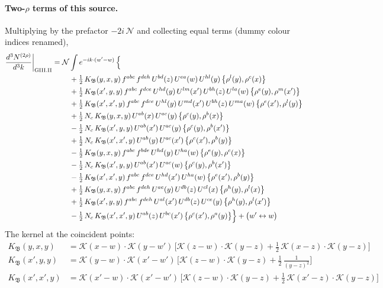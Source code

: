 \documentclass[10pt]{article}
\numberwithin{equation}{section}
\newcommand{\KK}{\mathcal K}
\newcommand{\NN}{\mathcal N}
\begin{document}
\paragraph{Two-$\rho$ terms of this source.} Multiplying by the prefactor $-2i\,\NN$ and collecting equal terms (dummy colour indices renamed),
\begin{align}
\frac{d^3N^{(2\rho)}}{d^3k}\bigg|_{\rm GIII.II}={}&\NN\int e^{-ik\cdot(w'-w)}\,\Big\{\notag\\
&\quad +\tfrac12\,K_{\mathfrak B}(y,x,y)\,f^{abc}\,f^{deh}\,U^{bd}(z)\,U^{ea}(w)\,U^{hl}(y)\,\big\{\rho^{l}(y),\rho^{c}(x)\big\}\notag\\
&\quad +\tfrac12\,K_{\mathfrak B}(x',y,y)\,f^{abc}\,f^{dce}\,U^{hd}(y)\,U^{lm}(x')\,U^{bh}(z)\,U^{la}(w)\,\big\{\rho^{e}(y),\rho^{m}(x')\big\}\notag\\
&\quad +\tfrac12\,K_{\mathfrak B}(x',x',y)\,f^{abc}\,f^{dce}\,U^{hl}(y)\,U^{md}(x')\,U^{bh}(z)\,U^{ma}(w)\,\big\{\rho^{e}(x'),\rho^{l}(y)\big\}\notag\\
&\quad +\tfrac12\,N_{c}\,K_{\mathfrak B}(y,x,y)\,U^{ab}(x)\,U^{ac}(y)\,\big\{\rho^{c}(y),\rho^{b}(x)\big\}\notag\\
&\quad -\tfrac12\,N_{c}\,K_{\mathfrak B}(x',y,y)\,U^{ab}(x')\,U^{ac}(y)\,\big\{\rho^{c}(y),\rho^{b}(x')\big\}\notag\\
&\quad +\tfrac12\,N_{c}\,K_{\mathfrak B}(x',x',y)\,U^{ab}(y)\,U^{ac}(x')\,\big\{\rho^{c}(x'),\rho^{b}(y)\big\}\notag\\
&\quad -\tfrac12\,K_{\mathfrak B}(y,x,y)\,f^{abc}\,f^{bde}\,U^{hd}(y)\,U^{ha}(w)\,\big\{\rho^{e}(y),\rho^{c}(x)\big\}\notag\\
&\quad -\tfrac12\,N_{c}\,K_{\mathfrak B}(x',y,y)\,U^{ab}(x')\,U^{ac}(w)\,\big\{\rho^{c}(y),\rho^{b}(x')\big\}\notag\\
&\quad -\tfrac12\,K_{\mathfrak B}(x',x',y)\,f^{abc}\,f^{dce}\,U^{hd}(x')\,U^{ha}(w)\,\big\{\rho^{e}(x'),\rho^{b}(y)\big\}\notag\\
&\quad +\tfrac12\,K_{\mathfrak B}(y,x,y)\,f^{abc}\,f^{deh}\,U^{ae}(y)\,U^{db}(z)\,U^{cl}(x)\,\big\{\rho^{h}(y),\rho^{l}(x)\big\}\notag\\
&\quad +\tfrac12\,K_{\mathfrak B}(x',y,y)\,f^{abc}\,f^{deh}\,U^{al}(x')\,U^{db}(z)\,U^{ce}(y)\,\big\{\rho^{h}(y),\rho^{l}(x')\big\}\notag\\
&\quad -\tfrac12\,N_{c}\,K_{\mathfrak B}(x',x',y)\,U^{ab}(z)\,U^{bc}(x')\,\big\{\rho^{c}(x'),\rho^{a}(y)\big\}\Big\}+\big(w'\leftrightarrow w\big)\label{eq:res-GIII.II}
\end{align}
The kernel at the coincident points:
\begin{align*}
K_{\mathfrak B}(y,x,y)&=\KK(x-w)\cdot\KK(y-w')\,\Big[\KK(z-w)\cdot\KK(y-z)+\tfrac12\,\KK(x-z)\cdot\KK(y-z)\Big]\\K_{\mathfrak B}(x',y,y)&=\KK(y-w)\cdot\KK(x'-w')\,\Big[\KK(z-w)\cdot\KK(y-z)+\tfrac12\,\frac{1}{(y-z)^2}\Big]\\K_{\mathfrak B}(x',x',y)&=\KK(x'-w)\cdot\KK(x'-w')\,\Big[\KK(z-w)\cdot\KK(y-z)+\tfrac12\,\KK(x'-z)\cdot\KK(y-z)\Big]
\end{align*}
\end{document}
